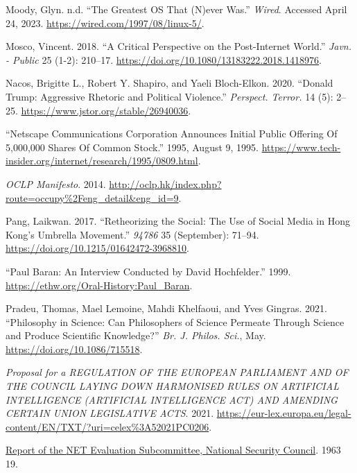 \documentclass[
  a4paper,
]{book}
\newlength{\cslhangindent}
\newlength{\cslentryspacingunit} %
\newenvironment{CSLReferences}[2] %
 {%
  \setlength{\parindent}{0pt}
  \ifodd #1
  \let\oldpar\par
  \def\par{\hangindent=\cslhangindent\oldpar}
  \fi
  \setlength{\parskip}{#2\cslentryspacingunit}
 }%
 {}
\begin{document}
\begin{CSLReferences}{1}{0}
\hypertarget{ref-moodyGreatestOSThat}{}
Moody, Glyn. n.d. {``The {Greatest OS That} ({N})ever {Was}.''} \emph{Wired}. Accessed April 24, 2023. \url{https://wired.com/1997/08/linux-5/}.

\hypertarget{ref-moscoCriticalPerspectivePostInternet2018}{}
Mosco, Vincent. 2018. {``A {Critical Perspective} on the {Post-Internet World}.''} \emph{Javn. - Public} 25 (1-2): 210--17. \url{https://doi.org/10.1080/13183222.2018.1418976}.

\hypertarget{ref-nacosDonaldTrumpAggressive2020}{}
Nacos, Brigitte L., Robert Y. Shapiro, and Yaeli Bloch-Elkon. 2020. {``Donald {Trump}: {Aggressive Rhetoric} and {Political Violence}.''} \emph{Perspect. Terror.} 14 (5): 2--25. \url{https://www.jstor.org/stable/26940036}.

\hypertarget{ref-NetscapeCommunicationsCorporation1995}{}
{``Netscape {Communications Corporation Announces Initial Public Offering Of} 5,000,000 {Shares Of Common Stock}.''} 1995, August 9, 1995. \url{https://www.tech-insider.org/internet/research/1995/0809.html}.

\hypertarget{ref-OCLPManifesto2014}{}
\emph{{OCLP Manifesto}}. 2014. \url{http://oclp.hk/index.php?route=occupy\%2Feng_detail\&eng_id=9}.

\hypertarget{ref-pangRetheorizingSocialUse2017}{}
Pang, Laikwan. 2017. {``Retheorizing the {Social}: {The Use} of {Social Media} in {Hong Kong}'s {Umbrella Movement}.''} \emph{94786} 35 (September): 71--94. \url{https://doi.org/10.1215/01642472-3968810}.

\hypertarget{ref-barnPaulBaranInterview1999}{}
{``Paul {Baran}: {An Interview Conducted} by {David Hochfelder}.''} 1999. \url{https://ethw.org/Oral-History:Paul_Baran}.

\hypertarget{ref-pradeuPhilosophyScienceCan2021}{}
Pradeu, Thomas, Mael Lemoine, Mahdi Khelfaoui, and Yves Gingras. 2021. {``Philosophy in {Science}: {Can} Philosophers of Science Permeate Through Science and Produce Scientific Knowledge?''} \emph{Br. J. Philos. Sci.}, May. \url{https://doi.org/10.1086/715518}.

\hypertarget{ref-ProposalREGULATIONEUROPEAN2021}{}
\emph{Proposal for a {REGULATION OF THE EUROPEAN PARLIAMENT AND OF THE COUNCIL LAYING DOWN HARMONISED RULES ON ARTIFICIAL INTELLIGENCE} ({ARTIFICIAL INTELLIGENCE ACT}) {AND AMENDING CERTAIN UNION LEGISLATIVE ACTS}}. 2021. \url{https://eur-lex.europa.eu/legal-content/EN/TXT/?uri=celex\%3A52021PC0206}.

\hypertarget{ref-ReportNETEvaluation1963}{}
\href{https://nsarchive.gwu.edu/document/28620-document-12-1963-report-net-evaluation-subcommittee-national-security-council-oral}{Report of the {NET Evaluation Subcommittee}, {National Security Council}}. 1963 19.


\end{CSLReferences}
\end{document}
